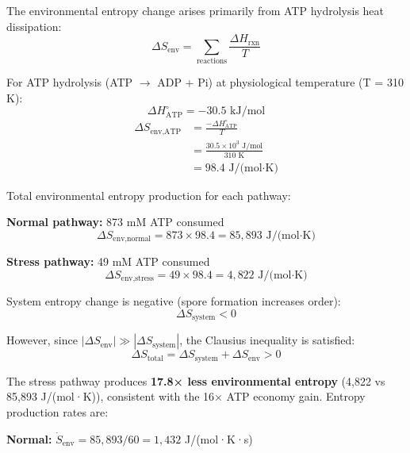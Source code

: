 \documentclass[twocolumn,11pt]{article}
\begin{document}
The environmental entropy change arises primarily from ATP hydrolysis heat dissipation:
\begin{equation}
    \Delta S_{\text{env}} = \sum_{\text{reactions}} \frac{\Delta H_{\text{rxn}}}{T}
\end{equation}

For ATP hydrolysis (ATP $\rightarrow$ ADP + Pi) at physiological temperature (T = 310 K):
\begin{equation}
    \Delta H^\circ_{\text{ATP}} = -30.5 \text{ kJ/mol}
\end{equation}
\begin{equation}
\begin{split}
    \Delta S_{\text{env,ATP}} &= \frac{-\Delta H^\circ_{\text{ATP}}}{T} \\
    &= \frac{30.5 \times 10^3 \text{ J/mol}}{310 \text{ K}} \\
    &= 98.4 \text{ J/(mol·K)}
\end{split}
\end{equation}

Total environmental entropy production for each pathway:

\textbf{Normal pathway:} 873 mM ATP consumed
\begin{equation}
    \Delta S_{\text{env,normal}} = 873 \times 98.4 = 85,893 \text{ J/(mol·K)}
\end{equation}

\textbf{Stress pathway:} 49 mM ATP consumed
\begin{equation}
    \Delta S_{\text{env,stress}} = 49 \times 98.4 = 4,822 \text{ J/(mol·K)}
\end{equation}

System entropy change is negative (spore formation increases order):
\begin{equation}
    \Delta S_{\text{system}} < 0
\end{equation}

However, since $|\Delta S_{\text{env}}| \gg |\Delta S_{\text{system}}|$, the Clausius inequality is satisfied:
\begin{equation}
    \Delta S_{\text{total}} = \Delta S_{\text{system}} + \Delta S_{\text{env}} > 0
\end{equation}

The stress pathway produces \textbf{17.8× less environmental entropy} (4,822 vs 85,893 J/(mol·K)), consistent with the 16× ATP economy gain. Entropy production rates are:

\textbf{Normal:} $\dot{S}_{\text{env}} = 85,893 / 60 = 1,432$ J/(mol·K·s)
\end{document}

